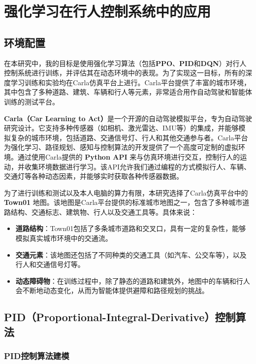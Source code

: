 \chapter{强化学习在行人控制系统中的应用}

\section{环境配置}

在本研究中，我的目标是使用强化学习算法（包括\textbf{PPO}、\textbf{PID}和\textbf{DQN}）对行人控制系统进行训练，并评估其在动态环境中的表现。为了实现这一目标，所有的深度学习训练和实验均在Carla仿真平台上进行。Carla平台提供了丰富的城市环境，其中包含了多种道路、建筑、车辆和行人等元素，非常适合用作自动驾驶和智能体训练的测试平台。

\textbf{Carla（Car Learning to Act）}是一个开源的自动驾驶模拟平台，专为自动驾驶研究设计。它支持多种传感器（如相机、激光雷达、IMU等）的集成，并能够模拟复杂的城市环境，包括道路、交通信号灯、行人和其他交通参与者。Carla平台为强化学习、路径规划、感知与控制算法的开发提供了一个高度可定制的虚拟环境。通过使用Carla提供的 \textbf{Python API} 来与仿真环境进行交互，控制行人的运动，并收集环境数据进行学习。该API允许我们通过编程的方式模拟行人、车辆、交通灯等各种动态因素，并能够实时获取各种传感器数据。

为了进行训练和测试以及本人电脑的算力有限，本研究选择了Carla仿真平台中的 \textbf{Town01} 地图。该地图是Carla平台提供的标准城市地图之一，包含了多种城市道路结构、交通标志、建筑物、行人以及交通工具等。具体来说：

\begin{itemize}
    \item \textbf{道路结构}：Town01包括了多条城市道路和交叉口，具有一定的复杂性，能够模拟真实城市环境中的交通流。
    \item \textbf{交通元素}：该地图还包括了不同种类的交通工具（如汽车、公交车等），以及行人和交通信号灯等。
    \item \textbf{动态障碍物}：在训练过程中，除了静态的道路和建筑外，地图中的车辆和行人会不断地动态变化，从而为智能体提供避障和路径规划的挑战。
\end{itemize}

\section{PID（Proportional-Integral-Derivative）控制算法}

\subsection{PID控制算法建模}

